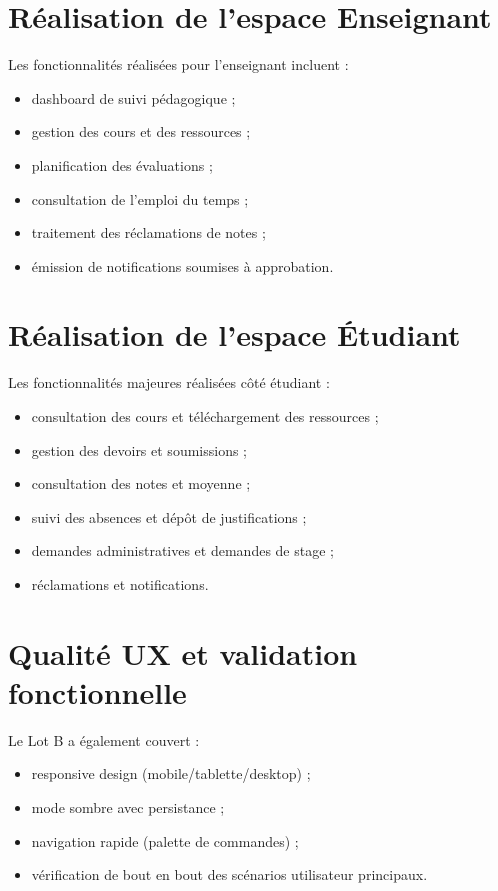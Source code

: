 \section{Réalisation de l'espace Enseignant}

Les fonctionnalités réalisées pour l'enseignant incluent :
\begin{itemize}[noitemsep]
    \item dashboard de suivi pédagogique ;
    \item gestion des cours et des ressources ;
    \item planification des évaluations ;
    \item consultation de l'emploi du temps ;
    \item traitement des réclamations de notes ;
    \item émission de notifications soumises à approbation.
\end{itemize}

\section{Réalisation de l'espace Étudiant}

Les fonctionnalités majeures réalisées côté étudiant :
\begin{itemize}[noitemsep]
    \item consultation des cours et téléchargement des ressources ;
    \item gestion des devoirs et soumissions ;
    \item consultation des notes et moyenne ;
    \item suivi des absences et dépôt de justifications ;
    \item demandes administratives et demandes de stage ;
    \item réclamations et notifications.
\end{itemize}

\section{Qualité UX et validation fonctionnelle}

Le Lot B a également couvert :
\begin{itemize}[noitemsep]
    \item responsive design (mobile/tablette/desktop) ;
    \item mode sombre avec persistance ;
    \item navigation rapide (palette de commandes) ;
    \item vérification de bout en bout des scénarios utilisateur principaux.
\end{itemize}

